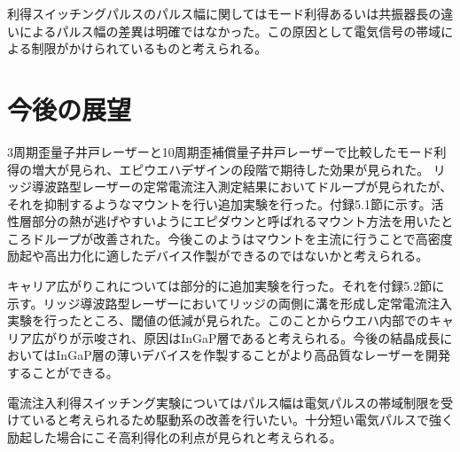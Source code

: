 利得スイッチングパルスのパルス幅に関してはモード利得あるいは共振器長の違いによるパルス幅の差異は明確ではなかった。この原因として電気信号の帯域による制限がかけられているものと考えられる。

\section{今後の展望}
3周期歪量子井戸レーザーと10周期歪補償量子井戸レーザーで比較したモード利得の増大が見られ、エピウエハデザインの段階で期待した効果が見られた。
リッジ導波路型レーザーの定常電流注入測定結果においてドループが見られたが、それを抑制するようなマウントを行い追加実験を行った。付録5.1節に示す。活性層部分の熱が逃げやすいようにエピダウンと呼ばれるマウント方法を用いたところドループが改善された。今後このようはマウントを主流に行うことで高密度励起や高出力化に適したデバイス作製ができるのではないかと考えられる。

キャリア広がりこれについては部分的に追加実験を行った。それを付録5.2節に示す。リッジ導波路型レーザーにおいてリッジの両側に溝を形成し定常電流注入実験を行ったところ、閾値の低減が見られた。このことからウエハ内部でのキャリア広がりが示唆され、原因はInGaP層であると考えられる。今後の結晶成長においてはInGaP層の薄いデバイスを作製することがより高品質なレーザーを開発することができる。


電流注入利得スイッチング実験についてはパルス幅は電気パルスの帯域制限を受けていると考えられるため駆動系の改善を行いたい。十分短い電気パルスで強く励起した場合にこそ高利得化の利点が見られと考えられる。